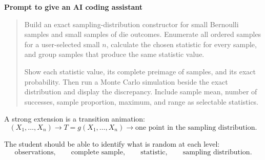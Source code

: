 \begin{examplebox}
\textbf{Prompt to give an AI coding assistant}

\begin{quote}\small
Build an exact sampling-distribution constructor for small Bernoulli samples and small samples of die outcomes. Enumerate all ordered samples for a user-selected small \(n\), calculate the chosen statistic for every sample, and group samples that produce the same statistic value.

Show each statistic value, its complete preimage of samples, and its exact probability. Then run a Monte Carlo simulation beside the exact distribution and display the discrepancy. Include sample mean, number of successes, sample proportion, maximum, and range as selectable statistics.
\end{quote}
\end{examplebox}

A strong extension is a transition animation:
\[
(X_1,\ldots,X_n)
\longrightarrow
T=g(X_1,\ldots,X_n)
\longrightarrow
\text{one point in the sampling distribution}.
\]

\begin{summarybox}
The student should be able to identify what is random at each level:
\[
\text{observations},\qquad
\text{complete sample},\qquad
\text{statistic},\qquad
\text{sampling distribution}.
\]
\end{summarybox}

